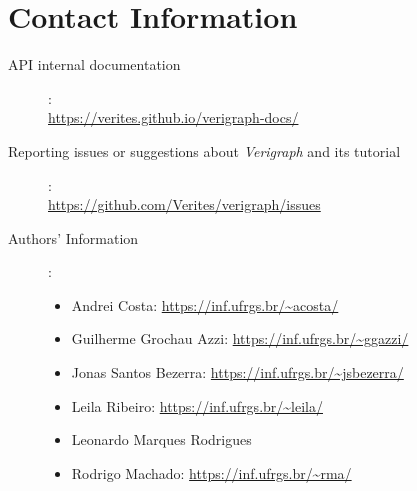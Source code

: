 \documentclass[12pt]{article}
\begin{document}
\pagebreak

\section{Contact Information}

\begin{description}
\item[API internal documentation]:\\ \url{https://verites.github.io/verigraph-docs/}
\item[Reporting issues or suggestions about \emph{Verigraph} and its tutorial]:\\ \url{https://github.com/Verites/verigraph/issues}
\item[Authors' Information]:
\begin{itemize}
\item Andrei Costa: \url{https://inf.ufrgs.br/~acosta/}
\item Guilherme Grochau Azzi: \url{https://inf.ufrgs.br/~ggazzi/}
\item Jonas Santos Bezerra: \url{https://inf.ufrgs.br/~jsbezerra/}
\item Leila Ribeiro: \url{https://inf.ufrgs.br/~leila/}
\item Leonardo Marques Rodrigues
\item Rodrigo Machado: \url{https://inf.ufrgs.br/~rma/}
\end{itemize}

\end{description}



\end{document}
